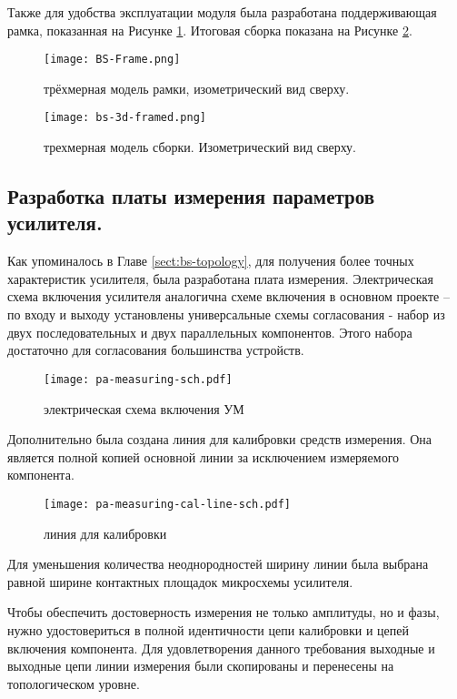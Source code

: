 Также для удобства эксплуатации модуля была разработана поддерживающая рамка, показанная на Рисунке \ref{fig:BS-Frame}. Итоговая сборка показана на Рисунке \ref{fig:bs-3d-framed}.

\begin{figure}[H]
	\centering
	\texttt{[image: BS-Frame.png]}
	\caption{трёхмерная модель рамки, изометрический вид сверху.}%
	\label{fig:BS-Frame}
\end{figure}

\begin{figure}[H]
	\centering
	\texttt{[image: bs-3d-framed.png]}
	\caption{трехмерная модель сборки. Изометрический вид сверху.}%
	\label{fig:bs-3d-framed}
\end{figure}


\subsection{Разработка платы измерения параметров усилителя.} \label{sect:bs-oa-mes}

Как упоминалось в Главе \ref{sect:bs-topology}, для получения более точных характеристик усилителя, была разработана плата измерения. Электрическая схема включения усилителя аналогична схеме включения в основном проекте – по входу и выходу установлены универсальные схемы согласования - набор из двух последовательных и двух параллельных компонентов. Этого набора достаточно для согласования большинства устройств.

\begin{figure}[H]
	\centering
	\texttt{[image: pa-measuring-sch.pdf]}
	\caption{электрическая схема включения УМ}%
	\label{fig:pa-measuring-sch}
\end{figure}

 Дополнительно была создана линия для калибровки средств измерения. Она является полной копией основной линии за исключением измеряемого компонента.

\begin{figure}[H]
	\centering
	\texttt{[image: pa-measuring-cal-line-sch.pdf]}
	\caption{линия для калибровки}%
	\label{fig:pa-measuring-cal-line-sch}
\end{figure}

Для уменьшения количества неоднородностей ширину линии была выбрана равной ширине контактных площадок микросхемы усилителя. 

Чтобы обеспечить достоверность измерения не только амплитуды, но и фазы, нужно удостовериться в полной идентичности цепи калибровки и цепей включения компонента. Для удовлетворения данного требования выходные и выходные цепи линии измерения были скопированы и перенесены на топологическом уровне. 

